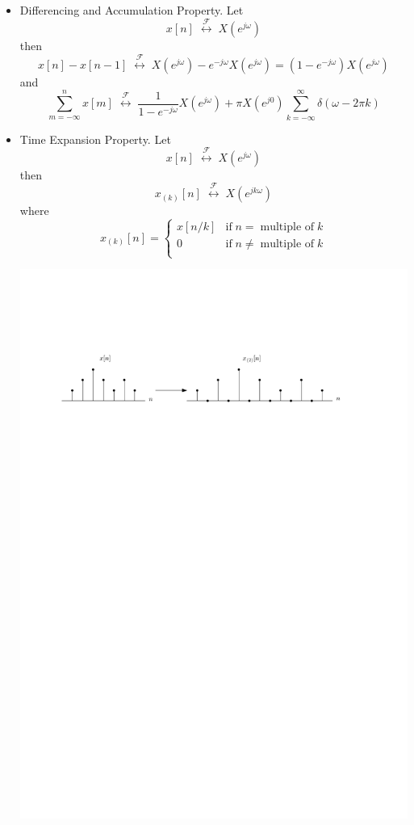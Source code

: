 \begin{itemize}
\item Differencing and Accumulation Property.
  Let
  \[
  x[n] \; \stackrel{\mathcal{F}}{\longleftrightarrow} \; X\left(e^{j\omega}\right)
  \]
  then
  \[
  x[n] - x[n-1] \; \stackrel{\mathcal{F}}{\longleftrightarrow} \; X\left(e^{j\omega}\right) - e^{-j\omega} X\left(e^{j\omega}\right) = \left(1-e^{-j\omega}\right)X\left(e^{j\omega}\right)
  \]
  and
  \[
  \sum\limits_{m = -\infty}^{n} x[m] \; \stackrel{\mathcal{F}}{\longleftrightarrow} \; \frac{1}{1-e^{-j\omega}}X\left(e^{j\omega}\right) + \pi X\left(e^{j0}\right)\sum\limits_{k = -\infty}^{\infty} \delta(\omega - 2\pi k) 
  \]
\item Time Expansion Property.
  Let
  \[
  x[n] \; \stackrel{\mathcal{F}}{\longleftrightarrow} \; X\left(e^{j\omega}\right)
  \]
  then
  \[
  x_{(k)}[n] \; \stackrel{\mathcal{F}}{\longleftrightarrow} \; X\left(e^{jk\omega}\right)
  \]
  where
  \[
  x_{(k)}[n] = \left\{ \begin{array}{lc}
    x[n/k] & \text{if}\; n = \; \text{multiple of}\; k\\
    0 & \text{if}\; n \neq \; \text{multiple of}\; k\\ 
  \end{array}
\right.
\]
\begin{center}
  \includegraphics[scale=0.8]{graphics/dt=transform-property-expand.pdf}

\end{center}
\end{itemize}
